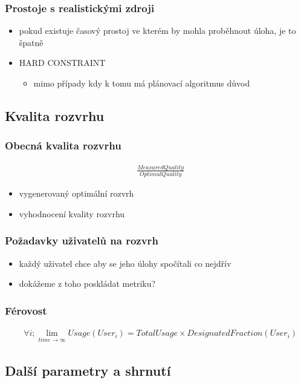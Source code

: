 \documentclass[pdftex,fleqn,aspectratio=169]{beamer}
\begin{document}
\begin{frame}
	\frametitle{Prostoje s realistickými zdroji}
	\begin{itemize}
		\item pokud existuje časový prostoj ve kterém by mohla proběhnout úloha, je to špatně \pause
		\item HARD CONSTRAINT
		\begin{itemize}
			\item{mimo případy kdy k tomu má plánovací algoritmus důvod}
		\end{itemize}
	\end{itemize}
\end{frame}

\subsection{Kvalita rozvrhu}

\begin{frame}
	\frametitle{Obecná kvalita rozvrhu}
	\begin{align*}
	& \frac{MeasuredQuality}{OptimalQuality}
	\end{align*}
	
	\begin{itemize}
		\item{vygenerovaný optimální rozvrh}
		\item{vyhodnocení kvality rozvrhu}
	\end{itemize}
\end{frame}

\begin{frame}
	\frametitle{Požadavky uživatelů na rozvrh}
	\begin{itemize}
		\item každý uživatel chce aby se jeho úlohy spočítali co nejdřív
		\item dokážeme z toho poskládat metriku?
	\end{itemize}
\end{frame}

\begin{frame}
	\frametitle{Férovost}
	\begin{align*}
	& \forall i; \lim_{time \to \infty} Usage(User_i) = TotalUsage \times DesignatedFraction(User_i)
	\end{align*}
\end{frame}

\subsection{Další parametry a shrnutí}
\end{document}
